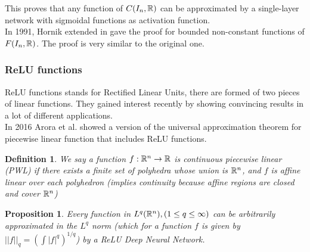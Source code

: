 \documentclass[12pt]{article}
\newtheorem{proposition}{Proposition}
\newtheorem{definition}{Definition}
\begin{document}
  This proves that any function of $C(I_n, \mathbb{R})$ can be approximated by a single-layer network with sigmoidal functions as activation function.\\

  In 1991, Hornik extended in \cite{hornik_approximation_1991} gave the proof for bounded non-constant functions of $F(I_n,\mathbb{R})$. The proof is very similar to the original one.\\

\subsubsection{ReLU functions}

ReLU functions stands for Rectified Linear Units, there are formed of two pieces of linear functions. They gained interest recently by showing convincing results in a lot of different applications.\\ 

In 2016 Arora et al. \cite{arora_understanding_2018} showed a version of the universal approximation theorem for piecewise linear function that includes ReLU functions.\\

\begin{definition}
  We say a function $f: \mathbb{R}^n \to \mathbb{R}$ is continuous piecewise linear (PWL) if there exists a finite set of polyhedra whose union is $\mathbb{R}^n$, and $f$ is affine linear over each polyhedron (implies continuity because affine regions are closed and cover $\mathbb{R}^n$)
\end{definition}

\begin{proposition}
  Every function in $L^q(\mathbb{R}^n), (1 \le q \le \infty)$ can be arbitrarily approximated in the $L^q$ norm (which for a function $f$ is given by $||f||_q = (\int |f|^q)^{1/q}$) by a ReLU Deep Neural Network.
\end{proposition}
\end{document}
